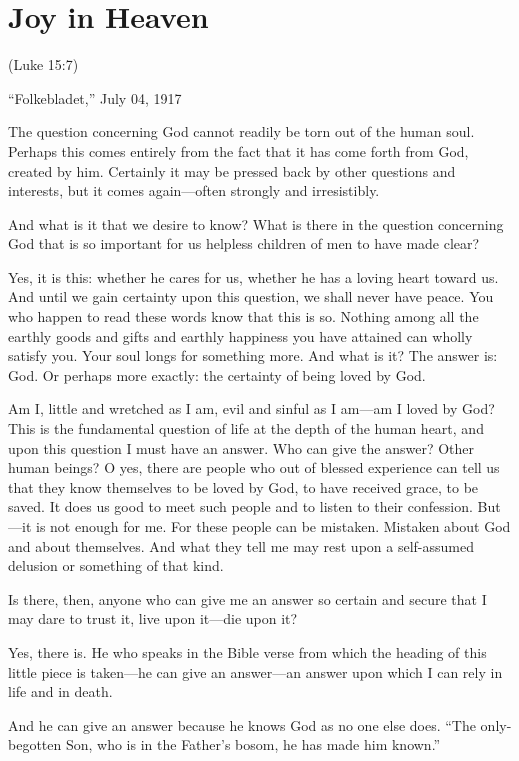 
\section{Joy in Heaven}

(Luke 15:7)


“Folkebladet,” July 04, 1917

The question concerning God cannot readily be torn out of the human soul. Perhaps this comes entirely from the fact that it has come forth from God, created by him. Certainly it may be pressed back by other questions and interests, but it comes again—often strongly and irresistibly.

And what is it that we desire to know? What is there in the question concerning God that is so important for us helpless children of men to have made clear?

Yes, it is this: whether he cares for us, whether he has a loving heart toward us. And until we gain certainty upon this question, we shall never have peace. You who happen to read these words know that this is so. Nothing among all the earthly goods and gifts and earthly happiness you have attained can wholly satisfy you. Your soul longs for something more. And what is it? The answer is: God. Or perhaps more exactly: the certainty of being loved by God.

Am I, little and wretched as I am, evil and sinful as I am—am I loved by God? This is the fundamental question of life at the depth of the human heart, and upon this question I must have an answer. Who can give the answer? Other human beings? O yes, there are people who out of blessed experience can tell us that they know themselves to be loved by God, to have received grace, to be saved. It does us good to meet such people and to listen to their confession. But—it is not enough for me. For these people can be mistaken. Mistaken about God and about themselves. And what they tell me may rest upon a self-assumed delusion or something of that kind.

Is there, then, anyone who can give me an answer so certain and secure that I may dare to trust it, live upon it—die upon it?

Yes, there is. He who speaks in the Bible verse from which the heading of this little piece is taken—he can give an answer—an answer upon which I can rely in life and in death.

And he can give an answer because he knows God as no one else does. “The only-begotten Son, who is in the Father’s bosom, he has made him known.”

